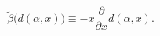 \begin{equation}\label{GL_Function}
\tilde\beta\Big(d(\alpha,x)\Big) \equiv
- x\frac{\partial}{\partial x} d(\alpha,x).
\end{equation}

